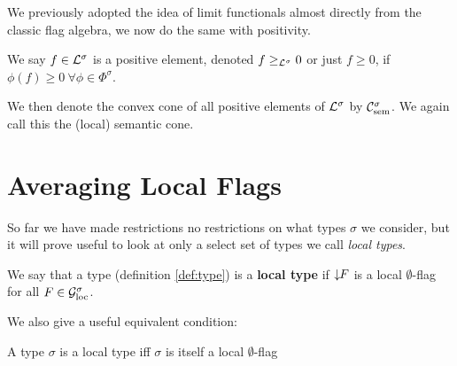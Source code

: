 We previously adopted the idea of limit functionals almost directly from the
classic flag algebra, we now do the same with positivity. 
\begin{definition}
    We say $f\in\mathcal{L}^\sigma$ is a positive element, denoted $f \geq_{\mathcal{L}^\sigma} 0$ or
    just $f\geq 0$, if $\phi(f) \geq 0\ \forall \phi\in\Phi^\sigma$.
\end{definition} 

We then denote the convex cone of all positive elements of $\mathcal{L}^\sigma$ by
$\mathcal{C}_\mathrm{sem}^\sigma$. We again call this the (local) semantic cone.

\section{Averaging Local Flags}

So far we have made restrictions no restrictions on what types $\sigma$ we consider, but
it will prove useful to look at only a select set of types we call \textit{local types}.
\begin{definition}
    We say that a type (definition \ref{def:type}) is a \textbf{local type}
    if ${\downarrow\!\!F}$ is a local $\emptyset$-flag for all $F\in\mathcal{G}_\mathrm{loc}^\sigma$.
\end{definition}

We also give a useful equivalent condition:
\begin{lemma}
    A type $\sigma$ is a local type iff $\sigma$ is itself a local $\emptyset$-flag
\end{lemma}

